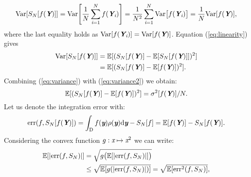 \begin{equation}\label{eq:variance}
\textrm{Var}[S_{N}[f(\textit{\textbf{Y}})]]= \textrm{Var}\Bigg[\frac{1}{N}\sum_{\textit{i}=1}^{N}f(\textit{\textbf{Y}}_{\textit{i}})\Bigg] =
 \frac{1}{N^2}\sum_{\textit{i}=1}^{N}\textrm{Var}\big[f(\textit{\textbf{Y}}_{\textit{i}})\big] = \frac{1}{N}\textrm{Var}[f(\textit{\textbf{Y}})], 
\end{equation} 
where the last equality holds as $\textrm{Var}[f(\textit{\textbf{Y}}_{\textit{i}})] = \textrm{Var}[f(\textit{\textbf{Y}})]$.
Equation (\ref{eq:linearity}) gives
\begin{equation}\label{eq:variance2}
\begin{aligned}
\textrm{Var}[S_N[f(\textit{\textbf{Y}})]] &= \mathbb{E}[(S_{N}[f(\textit{\textbf{Y}})]-\mathbb{E}[S_{N}[f(\textit{\textbf{Y}})]])^2]\\ &= \mathbb{E}[(S_{N}[f(\textit{\textbf{Y}})]-\mathbb{E}[f(\textit{\textbf{Y}})])^2].
\end{aligned}
\end{equation}
Combining (\ref{eq:variance}) with (\ref{eq:variance2}) we obtain:
\begin{equation}\label{eq:variance3}
\mathbb{E}[(S_{N}[f(\textit{\textbf{Y}})]-\mathbb{E}[f(\textit{\textbf{Y}})])^2] = \sigma^2[f(\textit{\textbf{Y}})]/N.
\end{equation}
Let us denote the integration error with:
\begin{equation}\label{eq:error1}
\textrm{err}(f, S_{N}[f(\textit{\textbf{Y}})]) =\int_{\textup{D}}f(\textit{\textbf{y}})\rho(\textit{\textbf{y}}) \textrm{d}\textit{\textbf{y}}-S_{N}[f] = \mathbb{E}[f(\textit{\textbf{Y}})]-S_N[f(\textit{\textbf{Y}})].
\end{equation}
Considering the convex function $g:\textit{x}\mapsto\textit{x}^2$ we can write:
\begin{equation}
\begin{aligned}
\mathbb{E}[|\textrm{err}(f, S_{N})|] &= \sqrt{g\big(\mathbb{E}[|\textrm{err}(f, S_{N})|]\big)} \\&\leq\sqrt{\mathbb{E}[g(|\textrm{err}(f, S_{N})|)]} = \sqrt{\mathbb{E}[\textrm{err}^2(f, S_{N})]},
\end{aligned}
\end{equation} 
